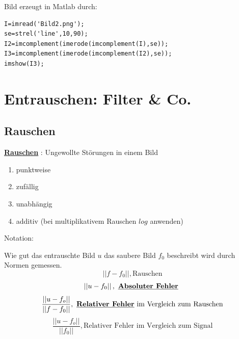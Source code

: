 \documentclass{article}
\theoremstyle{plain}
\theoremstyle{definition}
\numberwithin{equation}{section}
\newcommand{\norm}[1] {
\left|\left| #1 \right|\right|
}
\newcommand{\mim}[1] {
\underline{\textbf{#1\index{#1}}}
}
\begin{document}
        Bild erzeugt in Matlab durch:\\
        \begin{lstlisting}
I=imread('Bild2.png');
se=strel('line',10,90);
I2=imcomplement(imerode(imcomplement(I),se));
I3=imcomplement(imerode(imcomplement(I2),se));
imshow(I3);
        \end{lstlisting}

\section{Entrauschen: Filter \& Co.}
    \subsection{Rauschen}
        \mim{Rauschen}: Ungewollte Störungen in einem Bild
        \begin{enumerate}[label = \textbullet]
            \item punktweise
            \item zufällig
            \item unabhängig
            \item additiv (bei multiplikativem Rauschen $log$ anwenden)
        \end{enumerate}

        Notation:
        \begin{center}
        \end{center}

        Wie gut das entrauschte Bild $u$ das saubere Bild $f_0$ beschreibt wird durch Normen gemessen.
        \[\norm{f-f_0}, \text{Rauschen}\]
        \[\norm{u-f_0}, \text{\mim{Absoluter Fehler}}\]
        \[\frac{\norm{u-f_o}}{\norm{f-f_0}}, \text{\mim{Relativer Fehler} im Vergleich zum Rauschen}\]
        \[\frac{\norm{u-f_o}}{\norm{f_0}}, \text{Relativer Fehler im Vergleich zum Signal}\]
        
\end{document}
